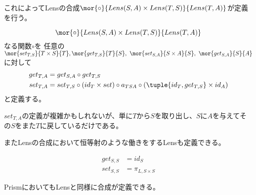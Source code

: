 \documentclass[uplatex,dvipdfmx]{jsarticle}
\begin{document}
  これによってLensの合成$\mor{\circ}{Lens(S,A)\times Lens(T,S)}{Lens(T,A)}$が定義を行う。
  \begin{define}\label{def-comp-of-lens}
    \[\mor{\circ}{Lens(S,A)\times Lens(T,S)}{Lens(T,A)}\]なる関数$\circ$を
    任意の$\mor{set_{T,S}}{T\times S}{T}, \mor{get_{T,S}}{T}{S},\ \mor{set_{S,A}}{S\times A}{S},\ \mor{get_{S,A}}{S}{A}$に対して
    \begin{align*}
      get_{T,A}&=get_{S,A}\circ get_{T,S}\\
      set_{T,A}&=set_{T,S}\circ(id_T\times set)\circ a_{TSA}\circ(\tuple{id_T, get_{T,S}}\times id_A)
    \end{align*}
    と定義する。
    \begin{center}
    \end{center}
  \end{define}
  $set_{T,A}$の定義が複雑かもしれないが、単に$T$から$S$を取り出し、$S$に$A$を与えてその$S$をまた$T$に戻しているだけである。

  またLensの合成において恒等射のような働きをするLensも定義できる。
  \begin{define}[恒等Lens]\label{def-identity-lens}
    \begin{align*}
      get_{S,S} &= id_S\\
      set_{S,S} &= \pi_{L,S\times S}
    \end{align*}
  \end{define}
  PrismにおいてもLensと同様に合成が定義できる。
\end{document}
